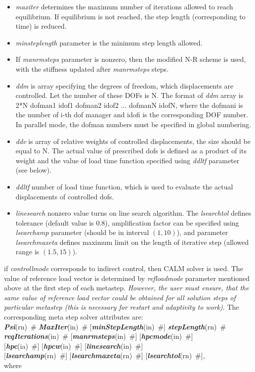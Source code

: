 \documentclass[draft]{article}
\newcommand{\param}[1]{{\em #1}}
\newcommand{\keywordnotype}[1]{\mbox{{\it{\bf{#1}}}}}
\newcommand{\keyword}[2]{\mbox{{\keywordnotype{#1}\tiny (#2)}}}
\newcommand{\field}[2]{\mbox{\keyword{#1}{#2}~\#}}
\newcommand{\optField}[2]{\mbox{[\field{#1}{#2}]}}
\newcommand{\Pmode}[1]{{\sffamily #1}}
\begin{document}
\begin{itemize}
\item \param{maxiter} determines the maximum
number of iterations allowed to reach equilibrium. If equilibrium is
not reached, the step length (corresponding to time) is reduced.
\item \param{minsteplength} parameter is the minimum step length
allowed. 
\item If \param{manrmsteps} parameter is nonzero, then the modified
N-R scheme is used, with the stiffness updated after
\param{manrmsteps} steps.
\item \param{ddm} is array specifying the degrees of freedom, 
which displacements are controlled. 
Let the number of these DOFs is N.
The format of \param{ddm} array is 2*N dofman1 idof1
dofman2 idof2 ... dofmanN idofN, where the dofmani is the number of i-th dof manager  and idofi is the
corresponding DOF number. \Pmode{In parallel mode, the dofman numbers
  must be specified in global numbering.}
\item \param{ddv} is array of relative weights of controlled
displacements, the size should be equal to N. The actual value of 
prescribed dofs is defined as a product of its weight and the value of
load time function specified using \param{ddltf} parameter (see
below).
\item \param{ddltf} number of load time function, which is used to
evaluate the actual displacements of controlled dofs.
\item \param {linesearch} nonzero value turns on line search
  algorithm. The \param{lsearchtol} defines tolerance (default value
  is 0.8), amplification
  factor can be specified using \param{lsearchamp} parameter (should
  be in interval $(1,10)$), and parameter \param{lsearchmaxeta}
  defines maximum limit on the length of iterative step (allowed range
  is $(1.5,15)$).
\end{itemize}

if \param{controllmode} corresponds to indirect control, then CALM
solver is used. The value of reference load vector is determined by
\param{refloadmode} parameter mentioned above at the first step of
each metastep. {\em However, the user must ensure, that the same value of
reference load vector could be obtained for all solution steps of
particular metastep (this is necessary for restart and adaptivity to work)}.
The corresponding meta step solver
attributes are:\\
\field{Psi}{rn} \field{MaxIter}{in} \optField{min\-Step\-Le\-ngth}{in}
\field{stepLength}{rn}\\ \field{reqIterations}{in}
\optField{manrmsteps}{in} \optField{hpcmode}{in}\\ \optField{hpc}{ia}
\optField{hpcw}{ia} \optField{linesearch}{in}\\
\optField{lsearchamp}{rn} \optField{lsearchmaxeta}{rn} \optField{lsearchtol}{rn},\\where
\end{document}
